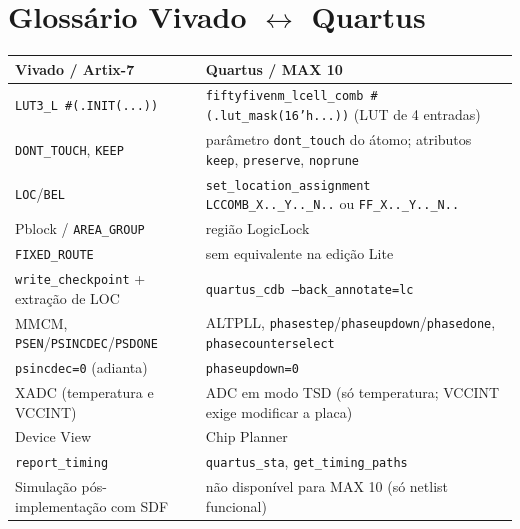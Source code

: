 \documentclass[11pt,a4paper]{article}
\begin{document}
\section{Glossário Vivado $\leftrightarrow$ Quartus}
\label{ap:glossario}
\begin{table}[H]
\centering
\small
\begin{tabularx}{\textwidth}{@{}L{4.6cm} Y@{}}
\toprule
\textbf{Vivado / Artix-7} & \textbf{Quartus / MAX 10} \\
\midrule
\texttt{LUT3\_L \#(.INIT(...))} & \texttt{fiftyfivenm\_lcell\_comb \#(.lut\_mask(16'h...))} (LUT de 4 entradas) \\
\texttt{DONT\_TOUCH}, \texttt{KEEP} & parâmetro \texttt{dont\_touch} do átomo; atributos \texttt{keep}, \texttt{preserve}, \texttt{noprune} \\
\texttt{LOC}/\texttt{BEL} & \texttt{set\_location\_assignment LCCOMB\_X..\_Y..\_N..} ou \texttt{FF\_X..\_Y..\_N..} \\
Pblock / \texttt{AREA\_GROUP} & região LogicLock \\
\texttt{FIXED\_ROUTE} & sem equivalente na edição Lite \\
\texttt{write\_checkpoint} + extração de LOC & \texttt{quartus\_cdb --back\_annotate=lc} \\
MMCM, \texttt{PSEN}/\texttt{PSINCDEC}/\texttt{PSDONE} & ALTPLL, \texttt{phasestep}/\texttt{phaseupdown}/\texttt{phasedone}, \texttt{phasecounterselect} \\
\texttt{psincdec=0} (adianta) & \texttt{phaseupdown=0} \\
XADC (temperatura e VCCINT) & ADC em modo TSD (só temperatura; VCCINT exige modificar a placa) \\
Device View & Chip Planner \\
\texttt{report\_timing} & \texttt{quartus\_sta}, \texttt{get\_timing\_paths} \\
Simulação pós-implementação com SDF & não disponível para MAX 10 (só netlist funcional) \\
\bottomrule
\end{tabularx}
\end{table}

\end{document}
